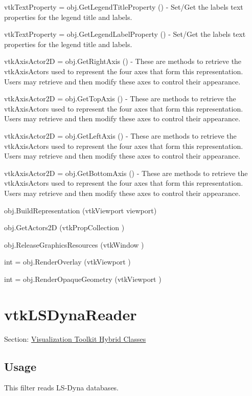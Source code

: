 \begin{DoxyItemize}
\item {\ttfamily vtk\-Text\-Property = obj.\-Get\-Legend\-Title\-Property ()} -\/ Set/\-Get the labels text properties for the legend title and labels.  
\item {\ttfamily vtk\-Text\-Property = obj.\-Get\-Legend\-Label\-Property ()} -\/ Set/\-Get the labels text properties for the legend title and labels.  
\item {\ttfamily vtk\-Axis\-Actor2\-D = obj.\-Get\-Right\-Axis ()} -\/ These are methods to retrieve the vtk\-Axis\-Actors used to represent the four axes that form this representation. Users may retrieve and then modify these axes to control their appearance.  
\item {\ttfamily vtk\-Axis\-Actor2\-D = obj.\-Get\-Top\-Axis ()} -\/ These are methods to retrieve the vtk\-Axis\-Actors used to represent the four axes that form this representation. Users may retrieve and then modify these axes to control their appearance.  
\item {\ttfamily vtk\-Axis\-Actor2\-D = obj.\-Get\-Left\-Axis ()} -\/ These are methods to retrieve the vtk\-Axis\-Actors used to represent the four axes that form this representation. Users may retrieve and then modify these axes to control their appearance.  
\item {\ttfamily vtk\-Axis\-Actor2\-D = obj.\-Get\-Bottom\-Axis ()} -\/ These are methods to retrieve the vtk\-Axis\-Actors used to represent the four axes that form this representation. Users may retrieve and then modify these axes to control their appearance.  
\item {\ttfamily obj.\-Build\-Representation (vtk\-Viewport viewport)}  
\item {\ttfamily obj.\-Get\-Actors2\-D (vtk\-Prop\-Collection )}  
\item {\ttfamily obj.\-Release\-Graphics\-Resources (vtk\-Window )}  
\item {\ttfamily int = obj.\-Render\-Overlay (vtk\-Viewport )}  
\item {\ttfamily int = obj.\-Render\-Opaque\-Geometry (vtk\-Viewport )}  
\end{DoxyItemize}\hypertarget{vtkhybrid_vtklsdynareader}{}\section{vtk\-L\-S\-Dyna\-Reader}\label{vtkhybrid_vtklsdynareader}
Section\-: \hyperlink{sec_vtkhybrid}{Visualization Toolkit Hybrid Classes} \hypertarget{vtkwidgets_vtkxyplotwidget_Usage}{}\subsection{Usage}\label{vtkwidgets_vtkxyplotwidget_Usage}
This filter reads L\-S-\/\-Dyna databases.

